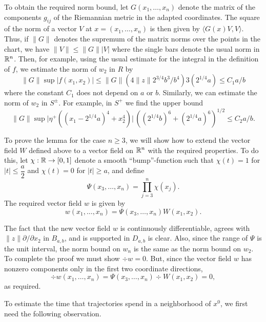 \begin{pf}
To obtain the required norm bound, let $G(x_1,\ldots,x_n)$ denote
the matrix of the components $g_{ij}$ of the Riemannian metric
in the adapted coordinates. The square of the norm of a vector $V$ at
$x=(x_1,\ldots,x_n)$ is then given by $\langle G(x)V,V\rangle$. Thus, if
$\|G\|$ denotes the supremum of the matrix norms  over the points
in the chart, we have $\|V\|\le  \|G\||V|$ where the single bars denote
the usual norm in ${\Bbb{R}}^n$.
Then, for example, using the usual estimate for the integral in the
definition of $f$, we estimate the norm of $w_2$ in $R$ by
\[
\|G\|\sup |f(x_1,x_2)|\le \|G\|(4\|z\|2^{3/4}b^3/b^4) 3 (2^{1/4}a)
\le C_1 a/b
\]
where the constant $C_1$  does not depend on $a$ or $b$.
Similarly, we can estimate the norm of $w_2$ in $S^\pm$. For example,
in $S^+$ we find the upper bound
\[
\|G\|\sup\big|\eta^+((x_1-2^{1/4}a)^4+x_2^4)\big|\,
((2^{1/4}b)^6+(2^{1/4}a)^6)^{1/2}
\le C_2 a/b.
\]

To prove the lemma for the case $n\ge 3$, we will show
how to extend the vector field $W$ defined above to a vector field on
${\Bbb{R}}^n$ with the required properties. To do this,
let $\chi : {\Bbb{R}} \to [0,1]$ denote a smooth ``bump''-function
such that
$\chi (t) =1$ for $|t|\le\dfrac{a}{2}$ and
$\chi (t) =0$ for $|t|\ge a$,  and
define
\[
\Psi(x_3,\ldots,x_n) =  \prod^n_{j=3} \chi (x_j).
\]
The required vector field $w$ is given by
\[
w(x_1,\ldots,x_n)=\Psi(x_3,\ldots,x_n)W(x_1,x_2).
\]

The fact that the new vector field $w$ is continuously
differentiable, agrees with $\|z\|{\partial}/{\partial x_2}$
in $B_{a,b}$,
and is  supported in $D_{a,b}$ is clear.
Also, since the range of $\Psi$ is
the unit interval, the norm bound on $w_n$
is the same as the
norm bound on $w_2$. To complete the proof
we must show $\div w=0$.
But, since the vector field $w$ has nonzero components only
in the first two coordinate directions,
\[\div w(x_1,\ldots,x_n)=\Psi(x_3,\ldots,x_n)\div W(x_1,x_2)=0,\]
as required.
\end{pf}

To estimate the time that trajectories spend in a neighborhood of
$x^0$, we first need the following observation.

